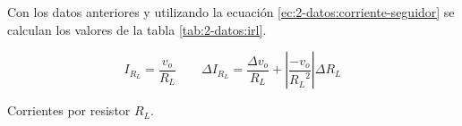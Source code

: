 Con los datos anteriores y utilizando la ecuación
\ref{ec:2-datos:corriente-seguidor} se calculan los valores de la tabla
\ref{tab:2-datos:irl}.

\begin{equation}
    \label{ec:2-datos:corriente-seguidor}
    I_{R_L} = \frac{v_o}{R_L} \quad\quad
    \Delta I_{R_L} = \frac{\Delta v_o}{R_L} + 
                     \left| \frac{-v_o}{{R_L}^2} \right| \Delta R_L 
\end{equation}

\begin{table}[H]
    \centering
    \caption{Corrientes por resistor $R_L$.}
    \label{tab:2-datos:irl}
\end{table}

